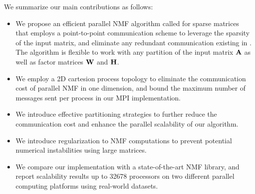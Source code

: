 %
%

We summarize our main contributions as follows:
\begin{itemize}
\item We propose an efficient parallel NMF algorithm called \distspnmf for sparse matrices that employs a point-to-point communication scheme to leverage the sparsity of the input matrix, and eliminate any redundant communication existing in \mpifaun.
The algorithm is flexible to work with any partition of the input matrix $\mathbf{A}$ as well as factor matrices $\mathbf{W}$ and $\mathbf{H}$.
\item We employ a 2D cartesion process topology to eliminate the communication cost of parallel NMF in one dimension, and bound the maximum number of messages sent per process in our MPI implementation.
\item We introduce effective partitioning strategies to further reduce the communication cost and enhance the parallel scalability of our algorithm.
\item We introduce regularization to NMF computations to prevent potential numerical instabilities using large matrices.
\item We compare our implementation with a state-of-the-art NMF library, and report scalability results up to 32678 processors on two different parallel computing platforms using real-world datasets.
\end{itemize}
